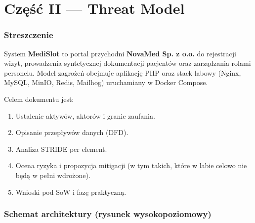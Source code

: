 \documentclass[11pt,a4paper]{article}
\begin{document}
\newpage
\part*{Część II — Threat Model}

\section{Streszczenie}

System \textbf{MediSlot} to portal przychodni \textbf{NovaMed Sp. z o.o.} do rejestracji wizyt, prowadzenia syntetycznej dokumentacji pacjentów oraz zarządzania rolami personelu. Model zagrożeń obejmuje aplikację PHP oraz stack labowy (Nginx, MySQL, MinIO, Redis, Mailhog) uruchamiany w Docker Compose.

Celem dokumentu jest:
\begin{enumerate}[leftmargin=*]
  \item Ustalenie aktywów, aktorów i granic zaufania.
  \item Opisanie przepływów danych (DFD).
  \item Analiza STRIDE per element.
  \item Ocena ryzyka i propozycja mitigacji (w tym takich, które w labie celowo nie będą w pełni wdrożone).
  \item Wnioski pod SoW i fazę praktyczną.
\end{enumerate}

\section{Schemat architektury (rysunek wysokopoziomowy)}
\end{document}
